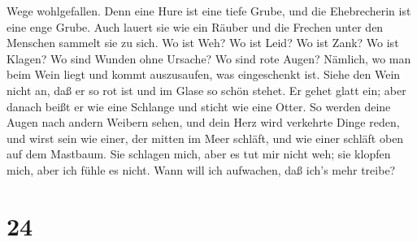 Wege wohlgefallen.  Denn eine Hure ist eine tiefe Grube,
und die Ehebrecherin ist eine enge Grube.  Auch lauert sie
wie ein Räuber und die Frechen unter den Menschen sammelt sie zu sich.
 Wo ist Weh? Wo ist Leid? Wo ist Zank? Wo ist Klagen? Wo
sind Wunden ohne Ursache? Wo sind rote Augen?  Nämlich, wo
man beim Wein liegt und kommt auszusaufen, was eingeschenkt ist.
 Siehe den Wein nicht an, daß er so rot ist und im Glase so
schön stehet. Er gehet glatt ein;  aber danach beißt er wie
eine Schlange und sticht wie eine Otter.  So werden deine
Augen nach andern Weibern sehen, und dein Herz wird verkehrte Dinge
reden,  und wirst sein wie einer, der mitten im Meer
schläft, und wie einer schläft oben auf dem Mastbaum.  Sie
schlagen mich, aber es tut mir nicht weh; sie klopfen mich, aber ich
fühle es nicht. Wann will ich aufwachen, daß ich's mehr treibe?

\hypertarget{section-23}{%
\section{24}\label{section-23}}

